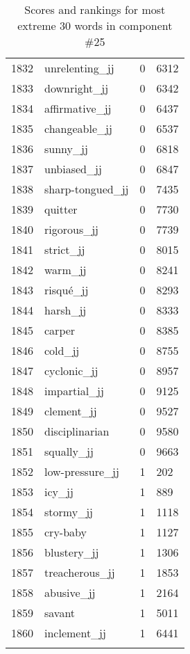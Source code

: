 \begin{longtable}[!htbp]{| rlr@{.}l |}
    1832 & unrelenting\_jj & 0 & 6312 \\
    1833 & downright\_jj & 0 & 6342 \\
    1834 & affirmative\_jj & 0 & 6437 \\
    1835 & changeable\_jj & 0 & 6537 \\
    1836 & sunny\_jj & 0 & 6818 \\
    1837 & unbiased\_jj & 0 & 6847 \\
    1838 & sharp-tongued\_jj & 0 & 7435 \\
    1839 & quitter & 0 & 7730 \\
    1840 & rigorous\_jj & 0 & 7739 \\
    1841 & strict\_jj & 0 & 8015 \\
    1842 & warm\_jj & 0 & 8241 \\
    1843 & risqué\_jj & 0 & 8293 \\
    1844 & harsh\_jj & 0 & 8333 \\
    1845 & carper & 0 & 8385 \\
    1846 & cold\_jj & 0 & 8755 \\
    1847 & cyclonic\_jj & 0 & 8957 \\
    1848 & impartial\_jj & 0 & 9125 \\
    1849 & clement\_jj & 0 & 9527 \\
    1850 & disciplinarian & 0 & 9580 \\
    1851 & squally\_jj & 0 & 9663 \\
    1852 & low-pressure\_jj & 1 & 202 \\
    1853 & icy\_jj & 1 & 889 \\
    1854 & stormy\_jj & 1 & 1118 \\
    1855 & cry-baby & 1 & 1127 \\
    1856 & blustery\_jj & 1 & 1306 \\
    1857 & treacherous\_jj & 1 & 1853 \\
    1858 & abusive\_jj & 1 & 2164 \\
    1859 & savant & 1 & 5011 \\
    1860 & inclement\_jj & 1 & 6441 \\
    \hline
    \caption{Scores and rankings for most extreme 30 words in component \#25} \\
\end{longtable}

